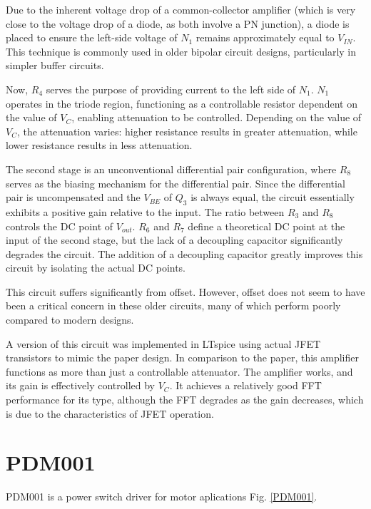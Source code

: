 \documentclass[12pt]{article}
\begin{document}
Due to the inherent voltage drop of a common-collector amplifier (which is very close to the voltage drop of a diode, as both involve a PN junction), a diode is placed to ensure the left-side voltage of $N_1$ remains approximately equal to $V_{IN}$. This technique is commonly used in older bipolar circuit designs, particularly in simpler buffer circuits.

Now, $R_4$ serves the purpose of providing current to the left side of $N_1$. $N_1$ operates in the triode region, functioning as a controllable resistor dependent on the value of $V_C$, enabling attenuation to be controlled. Depending on the value of $V_C$, the attenuation varies: higher resistance results in greater attenuation, while lower resistance results in less attenuation.

The second stage is an unconventional differential pair configuration, where $R_8$ serves as the biasing mechanism for the differential pair. Since the differential pair is uncompensated and the $V_{BE}$ of $Q_3$ is always equal, the circuit essentially exhibits a positive gain relative to the input. The ratio between $R_3$ and $R_8$ controls the DC point of $V_{out}$. $R_6$ and $R_7$ define a theoretical DC point at the input of the second stage, but the lack of a decoupling capacitor significantly degrades the circuit. The addition of a decoupling capacitor greatly improves this circuit by isolating the actual DC points.

This circuit suffers significantly from offset. However, offset does not seem to have been a critical concern in these older circuits, many of which perform poorly compared to modern designs.  

A version of this circuit was implemented in LTspice using actual JFET transistors to mimic the paper design. In comparison to the paper, this amplifier functions as more than just a controllable attenuator. The amplifier works, and its gain is effectively controlled by $V_C$. It achieves a relatively good FFT performance for its type, although the FFT degrades as the gain decreases, which is due to the characteristics of JFET operation.




\newpage




\section{PDM001}


PDM001 is a power switch driver for motor aplications Fig. \ref{PDM001}. 
\end{document}
